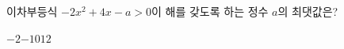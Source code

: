 \hspace*{2mm}\begin{minipage}[t]{\dimexpr\linewidth-2mm\relax}\vspace{0pt}
이차부등식 $-2x^2+4x-a>0$이 해를 갖도록 하는 정수 $a$의 최댓값은?
\begin{choices32}{$-2$}{$-1$}{$0$}{$1$}{$2$}\end{choices32}\end{minipage}
